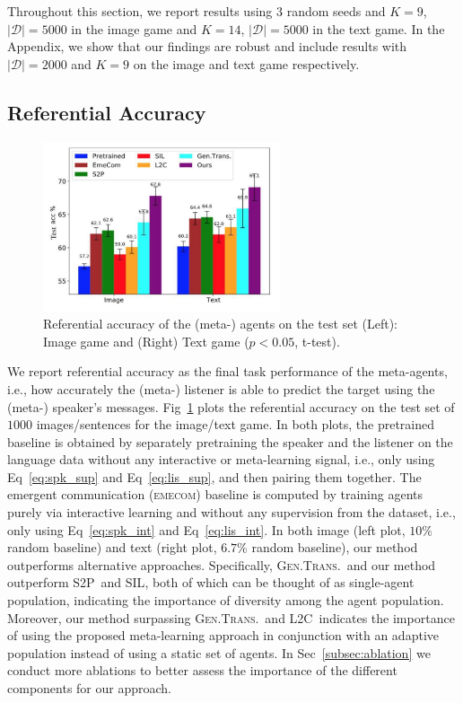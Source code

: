 \documentclass{article}
\newcommand{\emecom}{\textsc{emecom\xspace}}
\newcommand{\ltc}{\textsc{L2C\xspace}}
\newcommand{\stp}{\textsc{S2P\xspace}}
\newcommand{\gentrans}{\textsc{Gen.Trans.\xspace}}
\newcommand{\sil}{\textsc{SIL\xspace}}
\begin{document}
Throughout this section, we report results using $3$ random seeds and $K=9$, $|\mathcal{D}|=5000$ in the image game and $K=14$, $|\mathcal{D}|=5000$ in the text game. In the Appendix, we show that our findings are robust and include results with $|\mathcal{D}|=2000$ and $K=9$ on the image and text game respectively.

\subsection{Referential Accuracy}
\label{subsec:referential-acc}
\begin{figure}
    \centering
    \includegraphics[width=\linewidth, height=5cm]{figs/meta-agents-image-text.pdf}
    \caption{Referential accuracy of the (meta-) agents on the test set (Left): Image game and (Right) Text game ($p<0.05$, t-test).}
    \label{fig:meta-agents-ref-acc}
\end{figure}
We report referential accuracy as the final task performance of the meta-agents, i.e., how accurately the (meta-) listener is able to predict the target using the (meta-) speaker's messages. Fig~\ref{fig:meta-agents-ref-acc} plots the referential accuracy on the test set of $1000$ images/sentences for the image/text game. In both plots, the pretrained baseline is obtained by separately pretraining the speaker and the listener on the language data without any interactive or meta-learning signal, i.e., only using Eq~\ref{eq:spk_sup} and Eq~\ref{eq:lis_sup}, and then pairing them together. The emergent communication (\emecom) baseline is computed by training agents purely via interactive learning and without any supervision from the dataset, i.e., only using Eq~\ref{eq:spk_int} and Eq~\ref{eq:lis_int}. In both image (left plot, $10\%$ random baseline) and text (right plot, $6.7\%$ random baseline), our method outperforms alternative approaches. Specifically, \gentrans\ and our method outperform \stp\ and \sil, both of which can be thought of as single-agent population, indicating the importance of diversity among the agent population. 
Moreover, our method surpassing \gentrans\ and \ltc\ indicates the importance of using the proposed meta-learning approach in conjunction with an adaptive population instead of using a static set of agents. 
In Sec~\ref{subsec:ablation} we conduct more ablations to better assess the importance of the different components for our approach. 
\end{document}
